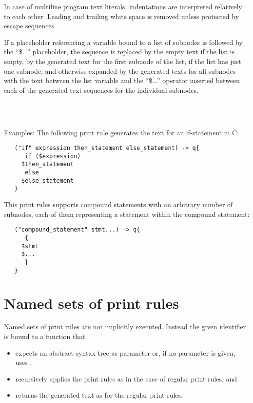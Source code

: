 In case of multiline program text literals, indentations are interpreted
relatively to each other. Leading and trailing white space is removed
unless protected by escape sequences.

If a placeholder referencing a variable bound to a list of 
subnodes is followed by the ``\$...'' placeholder, the
sequence is replaced by the empty text if the list is empty,
by the generated text for the first subnode of the list, if
the list has just one subnode, and otherwise expanded
by the generated texts for all subnodes with the text between
the list variable and the ``\$...'' operator inserted between
each of the generated text sequences for the individual subnodes.

\begin{grammar}
      \produces \lextoken{\$}  \\
      \produces \lextoken{\$}
	 \lextoken{\{}  \lextoken{\}} \\
      \produces {}
\end{grammar}

\noindent
Examples: The following print rule generates the text for an
if-statement in C:

\begin{lstlisting}
   ("if" expression then_statement else_statement) -> q{
      if ($expression)
	 $then_statement
      else
	 $else_statement
   }
\end{lstlisting}

\noindent
This print rules supports compound statements with an arbitrary
number of subnodes, each of them representing a statement within
the compound statement:

\begin{lstlisting}
   ("compound_statement" stmt...) -> q{
      {
	 $stmt
	 $...
      }
   }
\end{lstlisting}

\section{Named sets of print rules}\label{named-print}

Named sets of print rules are not implicitly executed. Instead the
given identifier is bound to a function that

\begin{itemize}
   \item expects an abstract syntax tree as parameter or,
      if no parameter is given, uses ,
   \item recursively applies the print rules as in the
      case of regular print rules, and
   \item returns the generated text as  for the
      regular print rules.
\end{itemize}

